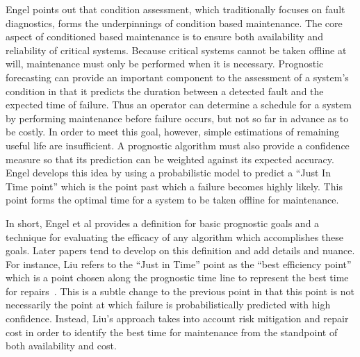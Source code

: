 \documentclass[12pt]{article}
\begin{document}
Engel points out that condition assessment, which traditionally
focuses on fault diagnostics, forms the underpinnings of condition
based maintenance.  The core aspect of conditioned based maintenance
is to ensure both availability and reliability of critical systems.
Because critical systems cannot be taken offline at will, maintenance
must only be performed when it is necessary.  Prognostic forecasting
can provide an important component to the assessment of a system's
condition in that it predicts the duration between a detected fault
and the expected time of failure.  Thus an operator can determine a
schedule for a system by performing maintenance before failure occurs,
but not so far in advance as to be costly.  In order to meet this
goal, however, simple estimations of remaining useful life are
insufficient.  A prognostic algorithm must also provide a confidence
measure so that its prediction can be weighted against its expected
accuracy.  Engel develops this idea by using a probabilistic model to
predict a ``Just In Time point'' which is the point past which a
failure becomes highly likely.  This point forms the optimal time for
a system to be taken offline for maintenance.

In short, Engel et al provides a definition for basic prognostic goals
and a technique for evaluating the efficacy of any algorithm which
accomplishes these goals.  Later papers tend to develop on this
definition and add details and nuance.  For instance, Liu refers to
the ``Just in Time'' point as the ``best efficiency point'' which is a
point chosen along the prognostic time line to represent the best time
for repairs~\cite{4585821}.  This is a subtle change to the previous
point in that this point is not necessarily the point at which failure
is probabilistically predicted with high confidence.  Instead, Liu's
approach takes into account risk mitigation and repair cost in order
to identify the best time for maintenance from the standpoint of both
availability and cost.
\end{document}
